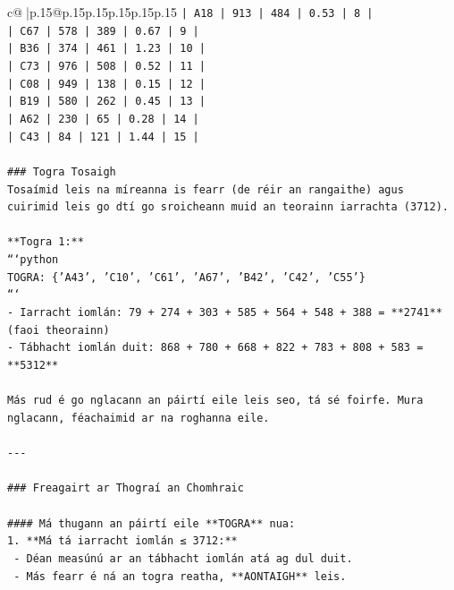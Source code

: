 \documentclass{article}
\begin{document}
{\begin{supertabular}{c@{$\;$}|p{.15\linewidth}@{}p{.15\linewidth}p{.15\linewidth}p{.15\linewidth}p{.15\linewidth}p{.15\linewidth}}
{{{\texttt{| A18  | 913      | 484      | 0.53              | 8     |} \\
\texttt{| C67  | 578      | 389      | 0.67              | 9     |} \\
\texttt{| B36  | 374      | 461      | 1.23              | 10    |} \\
\texttt{| C73  | 976      | 508      | 0.52              | 11    |} \\
\texttt{| C08  | 949      | 138      | 0.15              | 12    |} \\
\texttt{| B19  | 580      | 262      | 0.45              | 13    |} \\
\texttt{| A62  | 230      | 65       | 0.28              | 14    |} \\
\texttt{| C43  | 84       | 121      | 1.44              | 15    |} \\
\\ 
\texttt{\#\#\# Togra Tosaigh} \\
\texttt{Tosaímid leis na míreanna is fearr (de réir an rangaithe) agus cuirimid leis go dtí go sroicheann muid an teorainn iarrachta (3712).} \\
\\ 
\texttt{**Togra 1:**} \\
\texttt{```python} \\
\texttt{TOGRA: \{'A43', 'C10', 'C61', 'A67', 'B42', 'C42', 'C55'\}} \\
\texttt{```} \\
\texttt{{-} Iarracht iomlán: 79 + 274 + 303 + 585 + 564 + 548 + 388 = **2741** (faoi theorainn)} \\
\texttt{{-} Tábhacht iomlán duit: 868 + 780 + 668 + 822 + 783 + 808 + 583 = **5312**} \\
\\ 
\texttt{Más rud é go nglacann an páirtí eile leis seo, tá sé foirfe. Mura nglacann, féachaimid ar na roghanna eile.} \\
\\ 
\texttt{{-}{-}{-}} \\
\\ 
\texttt{\#\#\# Freagairt ar Thograí an Chomhraic} \\
\\ 
\texttt{\#\#\#\# Má thugann an páirtí eile **TOGRA** nua:} \\
\texttt{1. **Má tá iarracht iomlán ≤ 3712:**} \\
\texttt{   {-} Déan measúnú ar an tábhacht iomlán atá ag dul duit.} \\
\texttt{   {-} Más fearr é ná an togra reatha, **AONTAIGH** leis.} \\
}}}
\end{supertabular}}
\end{document}
